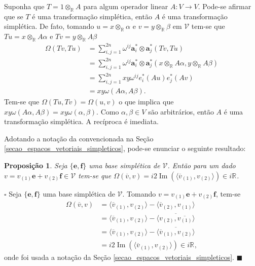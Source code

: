 \documentclass[12pt]{book}
\newtheorem{proposicao}[teorema]{Proposição}
\newenvironment{prova}[1]{$\square$ #1}{\hfill$\blacksquare$}
\DeclareMathOperator{\Ima}{Im}
\newcommand{\complexificado}[1]{\mathcal{#1}}
\newcommand{\complexificacaoelemento}[2]{#1\otimes_{\reta} #2}
\newcommand{\formaSimpletica}[2]{\omega(#1, #2)}
\newcommand{\formaSimpleticaExtendida}[2]{\Omega(#1, #2)}
\newcommand{\parteImaginaria}[1]{\Ima{(#1)}}
\newcommand{\produtointerno}[2]{\langle #1, #2 \rangle}
\newcommand{\real}[1]{\mathbb{R}^{#1}}
\newcommand{\reta}{\real{}}
\begin{document}
	Suponha que $T=\complexificacaoelemento{1}{A}$ para algum operador linear $A:V \to V$. Pode-se afirmar que se $T$ é uma transformação simplética, então $A$ é uma transformação simplética. De fato, tomando $u = \complexificacaoelemento{x}{\alpha}$ e $v=\complexificacaoelemento{y}{\beta}$ em $\complexificado{V}$ tem-se que $Tu = \complexificacaoelemento{x}{A\alpha}$ e $Tv= \complexificacaoelemento{y}{A\beta}$
	$$
	\begin{aligned}
	\Omega(Tv,Tu)
	&= \sum_{i,j = 1}^{2n}
	\omega^{ij}\textbf{a}^{*}_{i}\otimes \textbf{a}^{*}_{j}(Tv,Tu)
	\\
	&= 
	\sum_{i,j = 1}^{2n}
	\omega^{ij}\textbf{a}^{*}_{i}\otimes \textbf{a}^{*}_{j}(\complexificacaoelemento{x}{A\alpha},\complexificacaoelemento{y}{A\beta})
	\\
	&= \sum_{i,j = 1}^{2n}
	xy\omega^{ij}e^{*}_{i}(Au)e^{*}_{j}(Av)
	\\
	&= xy
	\formaSimpletica{A\alpha}{A\beta}.
	\end{aligned}
	$$  
	Tem-se que $\formaSimpleticaExtendida{Tu}{Tv} = \formaSimpleticaExtendida{u}{v}$ o que implica que $xy
	\formaSimpletica{A\alpha}{A\beta} = xy
	\formaSimpletica{\alpha}{\beta}$. Como $\alpha, \beta \in V$ são arbitrários, então $A$ é uma transformação simplética. A recíproca é imediata.
	
	Adotando a notação da convencionada na Seção \ref{secao_espacos_vetoriais_simpleticos}, pode-se enunciar o seguinte resultado:
	
	\begin{proposicao}\label{proposicao_forma_simpletica_vetor_conjugado}
		Seja $\{\textbf{e}, \textbf{f}\}$ uma base simplética de $\complexificado{V}$. Então para um dado $v = v_{(1)}\textbf{e}+v_{(2)}\textbf{f} \in \complexificado{V}$ tem-se que $\formaSimpleticaExtendida{\overline{v}}{v}
		=i2\parteImaginaria{\produtointerno{\overline{v}_{(1)}}{v_{(2)}}} \in i\reta$.
	\end{proposicao}
	\begin{prova}
		Seja $\{\textbf{e}, \textbf{f} \}$ uma base simplética de $\complexificado{V}$. Tomando $v = v_{(1)}\textbf{e}+v_{(2)}\textbf{f}$, tem-se
		$$
		\begin{aligned}
		\formaSimpleticaExtendida{\overline{v}}{v} 
		&= \produtointerno{\overline{v}_{(1)}}{v_{(2)}}- \produtointerno{\overline{v}_{(2)}}{v_{(1)}}
		\\
		&= \produtointerno{\overline{v}_{(1)}}{v_{(2)}}- \overline{\produtointerno{v_{(2)}}{\overline{v_{(1)}}}}
		\\
		&= \produtointerno{\overline{v}_{(1)}}{v_{(2)}}-\overline{ \produtointerno{\overline{v}_{(1)}}{v_{(2)}}}
		\\
		&=i2\parteImaginaria{\produtointerno{\overline{v}_{(1)}}{v_{(2)}}}\in i\reta,
		\end{aligned}
		$$
		onde foi usada a notação da Seção \ref{secao_espacos_vetoriais_simpleticos}.
	\end{prova}
		
\end{document}
